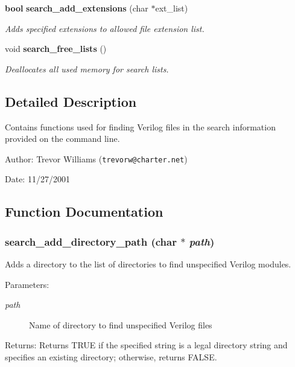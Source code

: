 \begin{CompactItemize}
{\bf bool} {\bf search\_\-add\_\-extensions} (char $\ast$ext\_\-list)
\begin{CompactList}\small\item\em Adds specified extensions to allowed file extension list. \item\end{CompactList}\item 
void {\bf search\_\-free\_\-lists} ()
\begin{CompactList}\small\item\em Deallocates all used memory for search lists. \item\end{CompactList}\end{CompactItemize}


\subsection{Detailed Description}
Contains functions used for finding Verilog files in the search information provided on the command line. 

\begin{Desc}
\item[Author:]Trevor Williams ({\tt trevorw@charter.net}) \end{Desc}
\begin{Desc}
\item[Date:]11/27/2001 \end{Desc}


\subsection{Function Documentation}
\subsubsection{ search\_\-add\_\-directory\_\-path (char $\ast$ {\em path})}\label{search_8h_a2}


Adds a directory to the list of directories to find unspecified Verilog modules. 

\begin{Desc}
\item[Parameters:]
\begin{description}
\item[{\em path}]Name of directory to find unspecified Verilog files \end{description}
\end{Desc}
\begin{Desc}
\item[Returns:]Returns TRUE if the specified string is a legal directory string and specifies an existing directory; otherwise, returns FALSE. \end{Desc}
